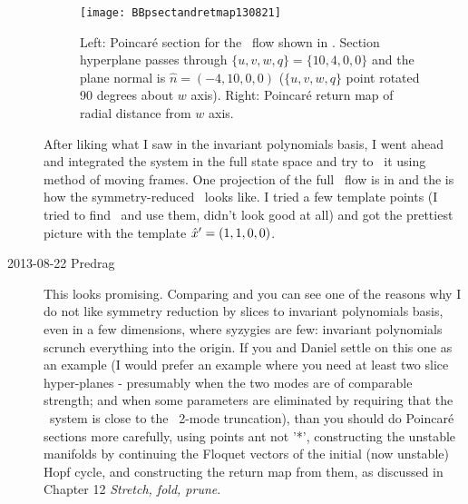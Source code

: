\begin{description}

\begin{figure}%
  \begin{center}
  \texttt{[image: BBpsectandretmap130821]}
  \end{center}
  \caption{Left: Poincar\'e section for the \twoMode\ flow shown in
  . Section hyperplane passes
  through $\{u,v,w,q\} = \{10, 4, 0, 0\}$ and the plane normal is
  $\hat{n} = (-4,10,0,0)$ ($\{u,v,w,q\}$  point rotated 90 degrees about $w$
  axis). Right: Poincar\'e return map of radial distance from $w$
  axis.}
  \label{fig:BBpsectandretmap130821}
\end{figure}

After liking what I saw in the invariant polynomials basis, I went ahead and integrated the system in the full state space and try to \slice\ it using method of moving frames. One projection of the full \statesp\ flow is in  and the  is how the symmetry-reduced \statesp\ looks like.
I tried a few template points (I tried to find \eqva\ and use them, didn't look good at all) and got the prettiest picture with the template ${\hat{x}'} = (1,1,0,0)$.



\item[2013-08-22 Predrag] This looks promising. Comparing
and
you can see one of the reasons why I do not like symmetry reduction by
slices to invariant polynomials basis, even in a few dimensions, where
syzygies are few: invariant polynomials scrunch everything into the
origin. If you and Daniel settle on this one as an example (I would
prefer an example where you need at least two slice hyper-planes -
presumably when the two modes are of comparable strength; and when
some parameters are eliminated by requiring that the \twoMode\ system
is close to the \KS\ 2-mode truncation), than you should do
Poincar\'e sections more carefully, using points ant not '*',
constructing the unstable manifolds by continuing the Floquet vectors
of the initial (now unstable) Hopf cycle, and constructing the return
map from them, as discussed in
{Chapter 12} {\em Stretch, fold, prune}.


\end{description}
